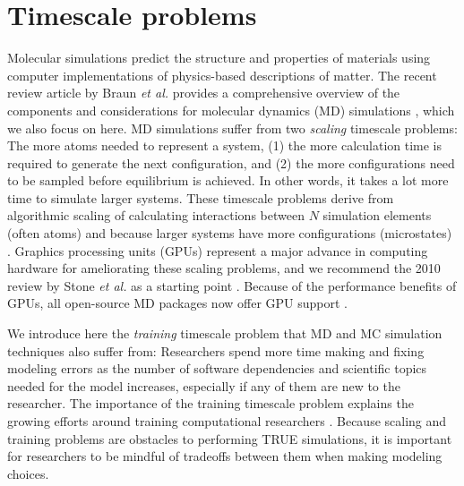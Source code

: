 \section{Timescale problems}\label{s:timescale_problems}
Molecular simulations predict the structure and properties of materials using computer implementations of physics-based descriptions of matter.
The recent review article by Braun \textit{et al.} provides a comprehensive overview of the components and considerations for molecular dynamics (MD) simulations \cite{Braun2019}, which we also focus on here.
MD simulations suffer from two \textit{scaling} timescale problems: The more atoms needed to represent a system, (1) the more calculation time is required to generate the next configuration, and (2) the more configurations need to be sampled before equilibrium is achieved.
In other words, it takes a lot more time to simulate larger systems.
These timescale problems derive from algorithmic scaling of calculating interactions between $N$ simulation elements (often atoms) and because larger systems have more configurations (microstates) \cite{Frenkel2013,Miller2018}. 
Graphics processing units (GPUs) represent a major advance in computing hardware for ameliorating these scaling problems, and we recommend the 2010 review by Stone \textit{et al.} as a starting point \cite{Stone2010}. %
Because of the performance benefits of GPUs, all open-source MD packages now offer GPU support \cite{Anderson2008,Trott2011b,Anderson2013,Glaser2014b, Zheng2013}.

We introduce here the \textit{training} timescale problem that MD and MC simulation techniques also suffer from: 
Researchers spend more time making and fixing modeling errors as the number of software dependencies and scientific topics needed for the model increases, especially if any of them are new to the researcher.
The importance of the training timescale problem explains the growing efforts around training computational researchers \cite{Wilson2014c}.
Because scaling and training problems are obstacles to performing TRUE simulations, it is important for researchers to be mindful of tradeoffs between them when making modeling choices.

